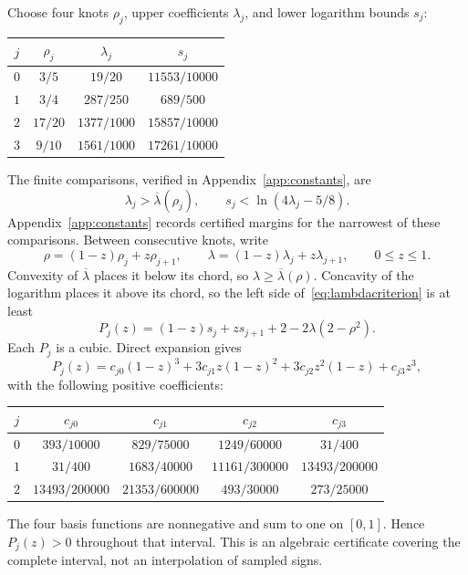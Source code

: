 Choose four knots $\rho_j$, upper coefficients $\lambda_j$, and lower logarithm bounds $s_j$:
\begin{center}
\renewcommand{\arraystretch}{1.2}
\begin{tabular}{@{}cccc@{}}
\toprule
$j$ & $\rho_j$ & $\lambda_j$ & $s_j$\\
\midrule
$0$ & $3/5$ & $19/20$ & $11553/10000$\\
$1$ & $3/4$ & $287/250$ & $689/500$\\
$2$ & $17/20$ & $1377/1000$ & $15857/10000$\\
$3$ & $9/10$ & $1561/1000$ & $17261/10000$\\
\bottomrule
\end{tabular}
\end{center}
The finite comparisons, verified in Appendix~\ref{app:constants}, are
\begin{equation}\label{eq:knotinequalities}
\lambda_j>\overline\lambda(\rho_j),\qquad
s_j<\ln(4\lambda_j-5/8).
\end{equation}
Appendix~\ref{app:constants} records certified margins for the narrowest of these comparisons.
Between consecutive knots, write
\[
\rho=(1-z)\rho_j+z\rho_{j+1},\qquad
\lambda=(1-z)\lambda_j+z\lambda_{j+1},\qquad 0\le z\le1.
\]
Convexity of $\overline\lambda$ places it below its chord, so $\lambda\ge\overline\lambda(\rho)$. Concavity of the logarithm places it above its chord, so the left side of~\eqref{eq:lambdacriterion} is at least
\begin{equation}\label{eq:cubic}
P_j(z)=(1-z)s_j+zs_{j+1}+2-2\lambda(2-\rho^2).
\end{equation}
Each $P_j$ is a cubic. Direct expansion gives
\[
P_j(z)=c_{j0}(1-z)^3+3c_{j1}z(1-z)^2
+3c_{j2}z^2(1-z)+c_{j3}z^3,
\]
with the following positive coefficients:
\begin{center}
\renewcommand{\arraystretch}{1.2}
\begin{tabular}{@{}ccccc@{}}
\toprule
$j$ & $c_{j0}$ & $c_{j1}$ & $c_{j2}$ & $c_{j3}$\\
\midrule
$0$ & $393/10000$ & $829/75000$ & $1249/60000$ & $31/400$\\
$1$ & $31/400$ & $1683/40000$ & $11161/300000$ & $13493/200000$\\
$2$ & $13493/200000$ & $21353/600000$ & $493/30000$ & $273/25000$\\
\bottomrule
\end{tabular}
\end{center}
The four basis functions are nonnegative and sum to one on $[0,1]$. Hence $P_j(z)>0$ throughout that interval. This is an algebraic certificate covering the complete interval, not an interpolation of sampled signs.

